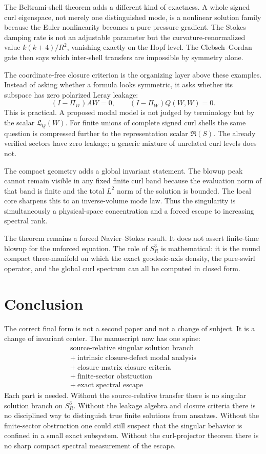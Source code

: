 \documentclass[aps,prd,reprint,superscriptaddress,nofootinbib,floatfix]{revtex4-2}
\theoremstyle{definition}
\theoremstyle{remark}
\begin{document}
The Beltrami-shell theorem adds a different kind of exactness.  A whole signed curl eigenspace, not merely one distinguished mode, is a nonlinear solution family because the Euler nonlinearity becomes a pure pressure gradient.  The Stokes damping rate is not an adjustable parameter but the curvature-renormalized value $k(k+4)/R^2$, vanishing exactly on the Hopf level.  The Clebsch--Gordan gate then says which inter-shell transfers are impossible by symmetry alone.


The coordinate-free closure criterion is the organizing layer above these examples.  Instead of asking whether a formula looks symmetric, it asks whether its subspace has zero polarized Leray leakage:
\[
	(I-\Pi_W)AW=0,\qquad (I-\Pi_W)Q(W,W)=0.
\]
This is practical.  A proposed modal model is not judged by terminology but by the scalar \(\mathfrak L_Q(W)\).  For finite unions of complete signed curl shells the same question is compressed further to the representation scalar \(\mathfrak R(S)\).  The already verified sectors have zero leakage; a generic mixture of unrelated curl levels does not.

The compact geometry adds a global invariant statement. The blowup peak cannot remain visible in any fixed finite curl band because the evaluation norm of that band is finite and the total $L^2$ norm of the solution is bounded. The local core sharpens this to an inverse-volume mode law. Thus the singularity is simultaneously a physical-space concentration and a forced escape to increasing spectral rank.

The theorem remains a forced Navier--Stokes result. It does not assert finite-time blowup for the unforced equation. The role of $S^3_R$ is mathematical: it is the round compact three-manifold on which the exact geodesic-axis density, the pure-swirl operator, and the global curl spectrum can all be computed in closed form.

\section{Conclusion}

The correct final form is not a second paper and not a change of subject.  It is a change of invariant center.  The manuscript now has one spine:
\[
	\begin{array}{c}
		\text{source-relative singular solution branch}   \\
		+\ \text{intrinsic closure-defect modal analysis} \\
		+\ \text{closure-matrix closure criteria}        \\
		+\ \text{finite-sector obstruction}               \\
		+\ \text{exact spectral escape}
	\end{array}
\]
Each part is needed.  Without the source-relative transfer there is no singular solution branch on \(S^3_R\).  Without the leakage algebra and closure criteria there is no disciplined way to distinguish true finite solutions from ansatzes.  Without the finite-sector obstruction one could still suspect that the singular behavior is confined in a small exact subsystem.  Without the curl-projector theorem there is no sharp compact spectral measurement of the escape.
\end{document}
